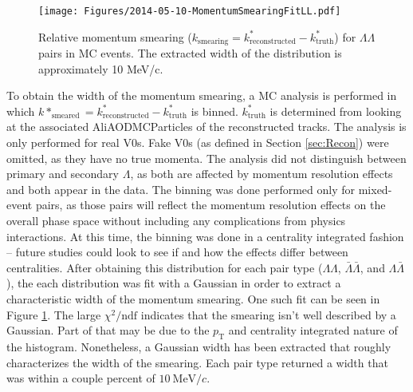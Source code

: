 \begin{figure}
\texttt{[image: Figures/2014-05-10-MomentumSmearingFitLL.pdf]}
\caption[Relative momentum smearing]{Relative momentum smearing ($k_{\mathrm{smearing}} = k^*_{\mathrm{reconstructed}} - k^*_{\mathrm{truth}}$) for $\Lambda\Lambda$ pairs in MC events.  
The extracted width of the distribution is approximately 10 MeV/c.}
\label{fig:MomSmearingFit}
\end{figure}

To obtain the width of the momentum smearing, a MC analysis is performed in which $k*_{\mathrm{smeared}} = k^*_{\mathrm{reconstructed}} - k^*_{\mathrm{truth}}$ is binned.  $k^*_{\mathrm{truth}}$ is determined from looking at the associated AliAODMCParticles of the reconstructed tracks.  
The analysis is only performed for real V0s.  
Fake V0s (as defined in Section \ref{sec:Recon}) were omitted, as they have no true momenta.  
The analysis did not distinguish between primary and secondary $\Lambda$, as both are affected by momentum resolution effects and both appear in the data.  
The binning was done performed only for mixed-event pairs, as those pairs will reflect the momentum resolution effects on the overall phase space without including any complications from physics interactions.  
At this time, the binning was done in a centrality integrated fashion -- future studies could look to see if and how the effects differ between centralities.  
After obtaining this distribution for each pair type ($\Lambda\Lambda$, $\bar{\Lambda}\bar{\Lambda}$, and $\Lambda\bar{\Lambda}$), the each distribution was fit with a Gaussian in order to extract a characteristic width of the momentum smearing.  
One such fit can be seen in Figure \ref{fig:MomSmearingFit}.  
The large $\chi^2 /\mathrm{ndf}$ indicates that the smearing isn't well described by a Gaussian.  
Part of that may be due to the $p_\mathrm{T}$ and centrality integrated nature of the histogram.  
Nonetheless, a Gaussian width has been extracted that roughly characterizes the width of the smearing.  
Each pair type returned a width that was within a couple percent of $10\ \mathrm{MeV}/c$.

